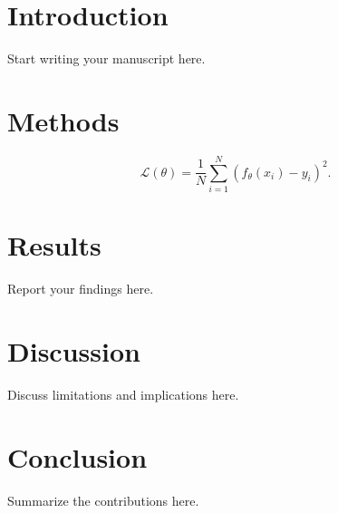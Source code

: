 \documentclass{article}
\begin{document}
\printAffiliationsAndNotice{}
\begin{abstract}
Write your abstract here.
\end{abstract}

\section{Introduction}
Start writing your manuscript here.

\section{Methods}
\begin{equation}
  \mathcal{L}(\theta) = \frac{1}{N}\sum_{i=1}^{N}(f_\theta(x_i)-y_i)^2.
  \label{eq:objective}
\end{equation}

\section{Results}
Report your findings here.

\section{Discussion}
Discuss limitations and implications here.

\section{Conclusion}
Summarize the contributions here.

% 
% 
\end{document}
